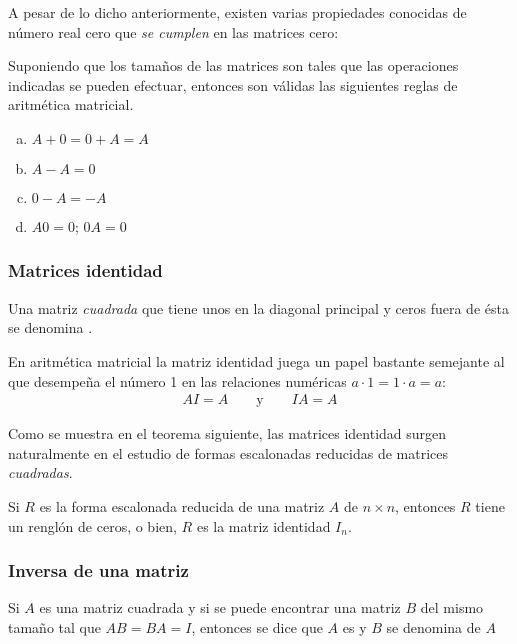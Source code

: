 \documentclass[a4paper,12pt]{article}
\begin{document}
A pesar de lo dicho anteriormente, existen varias propiedades conocidas de
número real cero que \emph{se cumplen} en las matrices cero:
\begin{theorem}
  Suponiendo que los tamaños de las matrices son tales que las operaciones
  indicadas se pueden efectuar, entonces son válidas las siguientes reglas de
  aritmética matricial.
  \begin{enumerate}[(a)]
    \item $A+0=0+A=A$
    \item $A-A=0$
    \item $0-A=-A$
    \item $A0=0$; $0A=0$
  \end{enumerate}
  \label{theo:cero}
\end{theorem}

\subsubsection{Matrices identidad}

\begin{concept}
  Una matriz \textit{cuadrada} que tiene unos en la diagonal principal y ceros
  fuera de ésta se denomina .
\end{concept}

En aritmética matricial la matriz identidad juega un papel bastante semejante
al que desempeña el número 1 en las relaciones numéricas $a\cdot1=1\cdot a=a$:
\begin{align*}
  AI=A \qquad \mbox{y} \qquad IA=A
\end{align*}

Como se muestra en el teorema siguiente, las matrices identidad surgen
naturalmente en el estudio de formas escalonadas reducidas de matrices
\emph{cuadradas}.

\begin{theorem}
  Si $R$ es la forma escalonada reducida de una matriz $A$ de $n\times n$,
  entonces $R$ tiene un renglón de ceros, o bien, $R$ es la matriz identidad
  $I_n$.
\end{theorem}

\subsubsection{Inversa de una matriz}

\begin{concept}
  Si $A$ es una matriz cuadrada y si se puede encontrar una matriz $B$ del
  mismo tamaño tal que $AB=BA=I$, entonces se dice que $A$ es
   y $B$ se denomina  de $A$
\end{concept}
\end{document}
